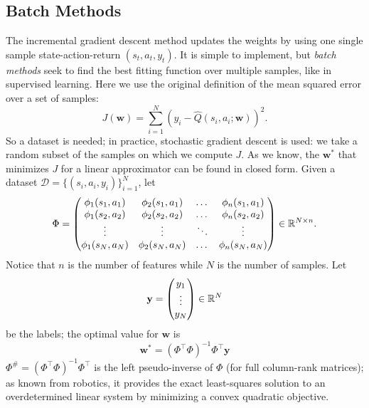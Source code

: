 \documentclass[10pt, a4paper]{report}
\newcommand{\y}{{\mathbf y}}
\begin{document}
\subsection{Batch Methods}
The incremental gradient descent method updates the weights by using one single sample state-action-return $(s_t,a_t,y_t)$. It is simple to implement, but \textit{batch methods} seek to find the best fitting function over multiple samples, like in supervised learning. Here we use the original definition of the mean squared error over a set of samples:
\begin{equation}
    J(\mathbf w)=\sum_{i=1}^N \left(
        y_i-\hat Q(s_i,a_i;\mathbf w)
    \right)^2.
\end{equation}
So a dataset is needed; in practice, stochastic gradient descent is used: we take a random subset of the samples on which we compute $J$. As we know, the $\mathbf w^*$ that minimizes $J$ for a linear approximator can be found in closed form. Given a dataset $\mathcal D=\{(s_i,a_i,y_i)\}_{i=1}^N$, let\begin{equation}
    \Phi=\begin{pmatrix}
        \phi_1(s_1,a_1)&\phi_2(s_1,a_1)&\dots & \phi_n(s_1,a_1)\\
        \phi_1(s_2,a_2)&\phi_2(s_2,a_2)&\dots & \phi_n(s_2,a_2)\\
        \vdots&\vdots&\ddots&\vdots\\ 
        \phi_1(s_N,a_N)&\phi_2(s_N,a_N)&\dots & \phi_n(s_N,a_N)
    \end{pmatrix}\in {\mathbb R}^{N\times n}.
\end{equation}
Notice that $n$ is the number of features while $N$ is the number of samples. Let \begin{equation}
    \mathbf y = \begin{pmatrix}
        y_1\\\vdots\\y_N
    \end{pmatrix}\in{\mathbb R}^N
\end{equation}
be the labels; the optimal value for $\mathbf w$ is\begin{equation}
    \boxed{\mathbf w^*=
    (\Phi^\top\Phi)^{-1}\Phi^\top\mathbf y
    }
\end{equation}
$\Phi^\# = (\Phi^\top \Phi)^{-1} \Phi^\top$ is the left pseudo-inverse of $\Phi$ (for full column-rank matrices); as known from robotics, it provides the exact least-squares solution to an overdetermined linear system by minimizing a convex quadratic objective.
\end{document}
